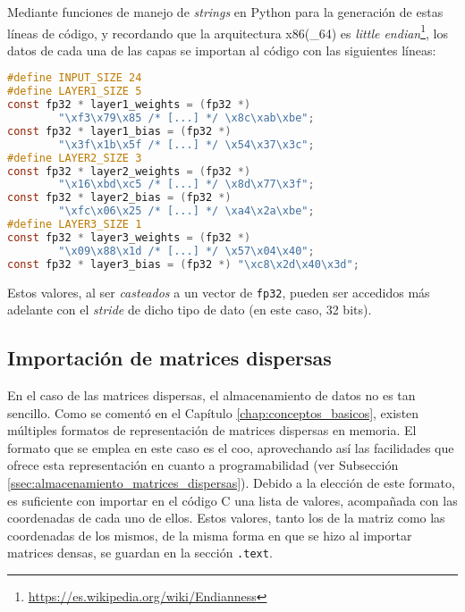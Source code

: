 Mediante funciones de manejo de \textit{strings} en Python para la generación de estas líneas de código, y recordando que la arquitectura x86(\_64) es \textit{little endian}\footnote{\url{https://es.wikipedia.org/wiki/Endianness}}, los datos de cada una de las capas se importan al código con las siguientes líneas:\medskip
\begin{lstlisting}[language=C]
#define INPUT_SIZE 24
#define LAYER1_SIZE 5
const fp32 * layer1_weights = (fp32 *)
        "\xf3\x79\x85 /* [...] */ \x8c\xab\xbe";
const fp32 * layer1_bias = (fp32 *)
        "\x3f\x1b\x5f /* [...] */ \x54\x37\x3c";
#define LAYER2_SIZE 3
const fp32 * layer2_weights = (fp32 *)
        "\x16\xbd\xc5 /* [...] */ \x8d\x77\x3f";
const fp32 * layer2_bias = (fp32 *)
        "\xfc\x06\x25 /* [...] */ \xa4\x2a\xbe";
#define LAYER3_SIZE 1
const fp32 * layer3_weights = (fp32 *)
        "\x09\x88\x1d /* [...] */ \x57\x04\x40";
const fp32 * layer3_bias = (fp32 *) "\xc8\x2d\x40\x3d";
\end{lstlisting}

Estos valores, al ser \textit{casteados} a un vector de \texttt{fp32}, pueden ser accedidos más adelante con el \textit{stride} de dicho tipo de dato (en este caso, 32 bits).

\subsection{Importación de matrices dispersas}
\label{ssec:importacion_matrices_dispersas}
En el caso de las matrices dispersas, el almacenamiento de datos no es tan sencillo. Como se comentó en el Capítulo \ref{chap:conceptos_basicos}, existen múltiples formatos de representación de matrices dispersas en memoria. El formato que se emplea en este caso es el \acrshort{coo}, aprovechando así las facilidades que ofrece esta representación en cuanto a programabilidad (ver Subsección \ref{ssec:almacenamiento_matrices_dispersas}). Debido a la elección de este formato, es suficiente con importar en el código C una lista de valores, acompañada con las coordenadas de cada uno de ellos. Estos valores, tanto los de la matriz como las coordenadas de los mismos, de la misma forma en que se hizo al importar matrices densas, se guardan en la sección \texttt{.text}.

